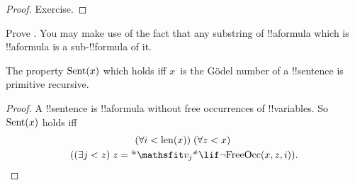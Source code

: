 \documentclass[../../../include/open-logic-section]{subfiles}
\begin{document}
\begin{proof}
Exercise.
\end{proof}

\begin{prob}
Prove .  You may make use
of the fact that any substring of !!a{formula} which is !!a{formula}
is a sub-!!{formula} of it.
\end{prob}

\begin{prop}
The property $\mathrm{Sent}(x)$ which holds iff $x$~is the G\"odel
number of a !!{sentence} is primitive recursive.
\end{prop}

\begin{proof}
A !!{sentence} is !!a{formula} without free occurrences of
!!{variable}s. So $\mathrm{Sent}(x)$ holds iff
\begin{multline*}
\bforall{i<\len{x}}{\bforall{z<x}{}}\\
(\bexists{j<z}{z=\Gn{\Obj v_j}} \lif \lnot\fn{FreeOcc}(x,z,i)).
\end{multline*}
\end{proof}
\end{document}
